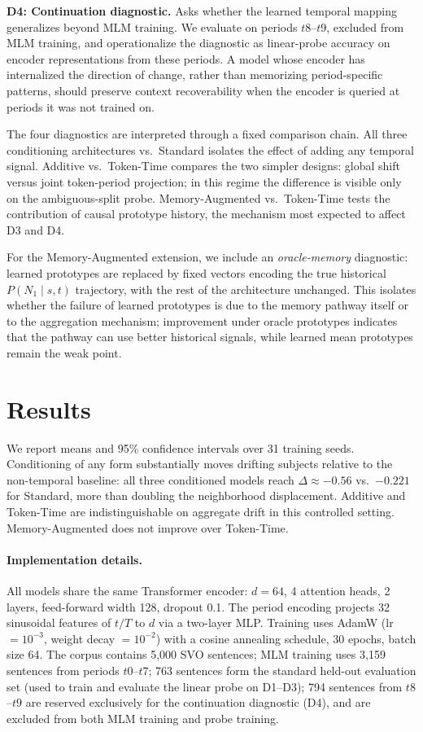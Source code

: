 \documentclass[runningheads]{llncs}
\begin{document}
\textbf{D4: Continuation diagnostic.} Asks whether the learned temporal
mapping generalizes beyond MLM training. We evaluate on periods
\(t8\)--\(t9\), excluded from MLM training, and operationalize the diagnostic as
linear-probe accuracy on encoder representations from these periods. A model
whose encoder has internalized the direction of change, rather than memorizing
period-specific patterns, should preserve context recoverability when the
encoder is queried at periods it was not trained on.

The four diagnostics are interpreted through a fixed comparison chain.
All three conditioning architectures vs.\ Standard isolates the effect of
adding any temporal signal. Additive vs.\ Token-Time compares the two simpler
designs: global shift versus joint token-period projection; in this regime the
difference is visible only on the ambiguous-split probe. Memory-Augmented
vs.\ Token-Time tests the contribution of causal prototype history, the
mechanism most expected to affect D3 and D4.

For the Memory-Augmented extension, we include an \textit{oracle-memory}
diagnostic: learned prototypes are replaced by fixed vectors encoding the true
historical \(P(N_1 \mid s,t)\) trajectory, with the rest of the architecture
unchanged. This isolates whether the failure of learned prototypes is due to the
memory pathway itself or to the aggregation mechanism; improvement under oracle
prototypes indicates that the pathway can use better historical signals, while
learned mean prototypes remain the weak point.

\section{Results}
We report means and 95\% confidence intervals over 31 training seeds.
Conditioning of any form substantially moves drifting subjects relative to the
non-temporal baseline: all three conditioned models reach \(\Delta\approx-0.56\)
vs.\ \(-0.221\) for Standard, more than doubling the neighborhood displacement.
Additive and Token-Time are indistinguishable on aggregate drift in this
controlled setting. Memory-Augmented does not improve over Token-Time.

\paragraph{Implementation details.}
All models share the same Transformer encoder: \(d=64\), 4 attention heads, 2
layers, feed-forward width 128, dropout 0.1. The period encoding projects 32
sinusoidal features of \(t/T\) to \(d\) via a two-layer MLP. Training uses
AdamW (lr \(=10^{-3}\), weight decay \(=10^{-2}\)) with a cosine annealing
schedule, 30 epochs, batch size 64. The corpus contains 5{,}000 SVO sentences;
MLM training uses 3{,}159 sentences from periods \(t0\)--\(t7\); 763 sentences
form the standard held-out evaluation set (used to train and evaluate the linear
probe on D1--D3); 794 sentences from \(t8\)--\(t9\) are reserved exclusively
for the continuation diagnostic (D4), and are excluded from both MLM training
and probe training.
\end{document}
